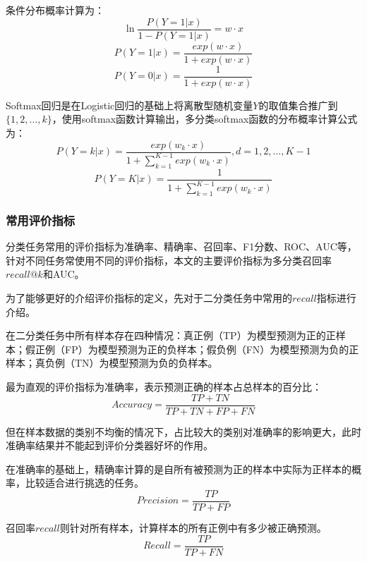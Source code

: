 \documentclass[master]{thesis-uestc}
\begin{document}
条件分布概率计算为：
\begin{equation}
   \ln \frac{P(Y=1|x)}{1-P(Y=1|x)}=w\cdot x
\end{equation}
\begin{equation}
   P(Y=1|x)=\frac{exp(w\cdot x)}{1+exp(w\cdot x)}
\end{equation}
\begin{equation}
   P(Y=0|x)=\frac{1}{1+exp(w\cdot x)}
\end{equation}

Softmax回归是在Logistic回归的基础上将离散型随机变量$Y$的取值集合推广到$\{1,2,\dots,k\}$，使用softmax函数计算输出，多分类softmax函数的分布概率计算公式为：
\begin{equation}
   P(Y=k|x)=\frac{exp(w_k\cdot x)}{1+\sum_{k=1}^{K-1}exp(w_k\cdot x)},d=1,2,\dots,K-1
\end{equation}
\begin{equation}
   P(Y=K|x)=\frac{1}{1+\sum_{k=1}^{K-1}exp(w_k\cdot x)}
\end{equation}

\subsubsection{常用评价指标}
分类任务常用的评价指标为准确率、精确率、召回率、F1分数、ROC、AUC等，针对不同任务常使用不同的评价指标，本文的主要评价指标为多分类召回率$recall@k$和AUC。

为了能够更好的介绍评价指标的定义，先对于二分类任务中常用的$recall$指标进行介绍。

在二分类任务中所有样本存在四种情况：真正例（TP）为模型预测为正的正样本；假正例（FP）为模型预测为正的负样本；假负例（FN）为模型预测为负的正样本；真负例（TN）为模型预测为负的负样本。

最为直观的评价指标为准确率，表示预测正确的样本占总样本的百分比：
\begin{equation}
   Accuracy=\frac{TP+TN}{TP+TN+FP+FN}
\end{equation}

但在样本数据的类别不均衡的情况下，占比较大的类别对准确率的影响更大，此时准确率结果并不能起到评价分类器好坏的作用。

在准确率的基础上，精确率计算的是自所有被预测为正的样本中实际为正样本的概率，比较适合进行挑选的任务。
\begin{equation}
   Precision=\frac{TP}{TP+FP}
\end{equation}

召回率$recall$则针对所有样本，计算样本的所有正例中有多少被正确预测。
\begin{equation}
   Recall=\frac{TP}{TP+FN}
\end{equation}
\end{document}
